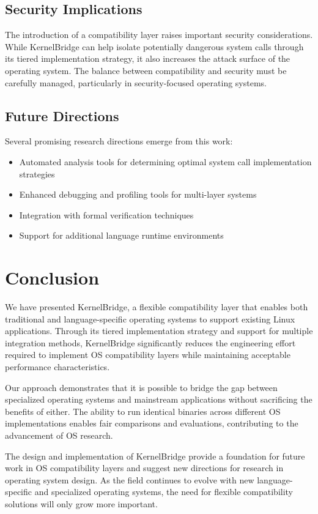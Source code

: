 \documentclass[conference]{IEEEtran}
\begin{document}
\subsection{Security Implications}
The introduction of a compatibility layer raises important security considerations. While KernelBridge can help isolate potentially dangerous system calls through its tiered implementation strategy, it also increases the attack surface of the operating system. The balance between compatibility and security must be carefully managed, particularly in security-focused operating systems.

\subsection{Future Directions}
Several promising research directions emerge from this work:
\begin{itemize}
	\item Automated analysis tools for determining optimal system call implementation strategies
	\item Enhanced debugging and profiling tools for multi-layer systems
	\item Integration with formal verification techniques
	\item Support for additional language runtime environments
\end{itemize}

\section{Conclusion}
We have presented KernelBridge, a flexible compatibility layer that enables both traditional and language-specific operating systems to support existing Linux applications. Through its tiered implementation strategy and support for multiple integration methods, KernelBridge significantly reduces the engineering effort required to implement OS compatibility layers while maintaining acceptable performance characteristics.

Our approach demonstrates that it is possible to bridge the gap between specialized operating systems and mainstream applications without sacrificing the benefits of either. The ability to run identical binaries across different OS implementations enables fair comparisons and evaluations, contributing to the advancement of OS research.

The design and implementation of KernelBridge provide a foundation for future work in OS compatibility layers and suggest new directions for research in operating system design. As the field continues to evolve with new language-specific and specialized operating systems, the need for flexible compatibility solutions will only grow more important.


\end{document}
